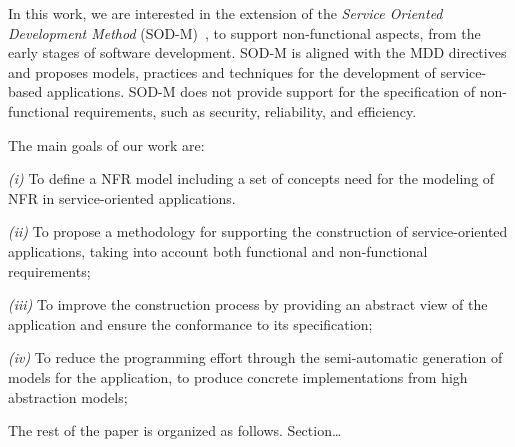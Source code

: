 In this work, we are interested in the extension of the \textit{Service Oriented Development Method} (SOD-M)~\cite{decastro1}, to support non-functional aspects, from the early stages of software development.
SOD-M is aligned with the MDD directives and proposes models, practices and techniques for the development of service-based applications.
SOD-M does not provide support for the specification of non-functional requirements, such as
security, reliability, and efficiency. 

The main goals of our work are:
\begin{trivlist}
\item \textit{(i)} To define a NFR model including a set of concepts need for the modeling of NFR in service-oriented applications.
\item \textit{(ii)} To propose a methodology for supporting the construction of service-oriented applications, taking into account both functional and non-functional requirements;
\item \textit{(iii)} To improve the construction process by providing an abstract view of the application and ensure the conformance to its specification;
\item \textit{(iv)} To reduce the programming effort through the semi-automatic generation of  models for the application, to produce concrete implementations from high abstraction models;
\end{trivlist}

The rest of the paper is organized as follows. 
Section\dots

